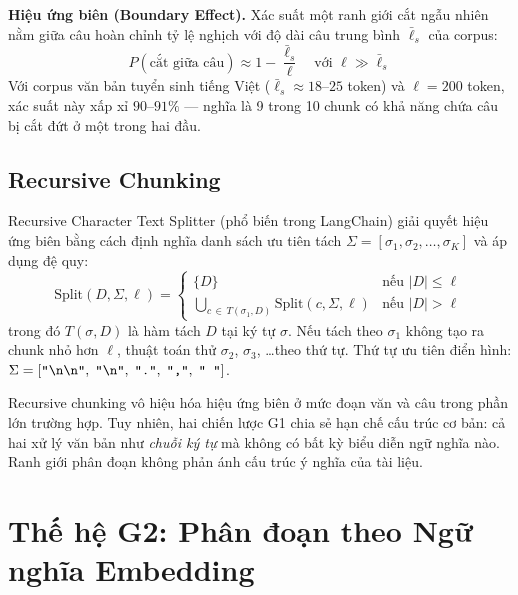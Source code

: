 \documentclass[12pt,a4paper]{report}
\theoremstyle{plain}
\theoremstyle{definition}
\begin{document}
	\textbf{Hiệu ứng biên (Boundary Effect).} Xác suất một ranh giới cắt ngẫu
	nhiên nằm giữa câu hoàn chỉnh tỷ lệ nghịch với độ dài câu trung bình
	$\bar{\ell}_s$ của corpus:
	\begin{equation}
		P(\text{cắt giữa câu}) \approx 1 - \frac{\bar{\ell}_s}{\ell}
		\quad \text{với } \ell \gg \bar{\ell}_s
		\label{eq:boundary_prob}
	\end{equation}
	Với corpus văn bản tuyển sinh tiếng Việt ($\bar{\ell}_s \approx 18$--$25$
	token) và $\ell = 200$ token, xác suất này xấp xỉ $90$--$91\%$ --- nghĩa
	là 9 trong 10 chunk có khả năng chứa câu bị cắt đứt ở một trong hai đầu.
	
	\subsection{Recursive Chunking}
	\label{subsec:recursive}
	
	Recursive Character Text Splitter (phổ biến trong LangChain) giải quyết
	hiệu ứng biên bằng cách định nghĩa danh sách ưu tiên tách
	$\Sigma = [\sigma_1, \sigma_2, \ldots, \sigma_K]$ và áp dụng đệ quy:
	\begin{equation}
		\text{Split}(D, \Sigma, \ell) =
		\begin{cases}
			\{D\} & \text{nếu } |D| \leq \ell \\[4pt]
			\displaystyle\bigcup_{c \,\in\, T(\sigma_1, D)}
			\text{Split}(c, \Sigma, \ell)
			& \text{nếu } |D| > \ell
		\end{cases}
		\label{eq:recursive_split}
	\end{equation}
	trong đó $T(\sigma, D)$ là hàm tách $D$ tại ký tự $\sigma$. Nếu tách theo
	$\sigma_1$ không tạo ra chunk nhỏ hơn $\ell$, thuật toán thử $\sigma_2$,
	$\sigma_3$, \ldots theo thứ tự. Thứ tự ưu tiên điển hình:
	$\Sigma = [\texttt{\textquotedbl\textbackslash n\textbackslash n\textquotedbl},\;
	\texttt{\textquotedbl\textbackslash n\textquotedbl},\;
	\texttt{\textquotedbl.\textquotedbl},\;
	\texttt{\textquotedbl,\textquotedbl},\;
	\texttt{\textquotedbl\ \textquotedbl}]$.
	
	Recursive chunking vô hiệu hóa hiệu ứng biên ở mức đoạn văn và câu trong
	phần lớn trường hợp. Tuy nhiên, hai chiến lược G1 chia sẻ hạn chế cấu trúc
	cơ bản: cả hai xử lý văn bản như \emph{chuỗi ký tự} mà không có bất kỳ
	biểu diễn ngữ nghĩa nào. Ranh giới phân đoạn không phản ánh cấu trúc ý
	nghĩa của tài liệu.
	
	\section{Thế hệ G2: Phân đoạn theo Ngữ nghĩa Embedding}
	\label{sec:g2}
	
\end{document}

